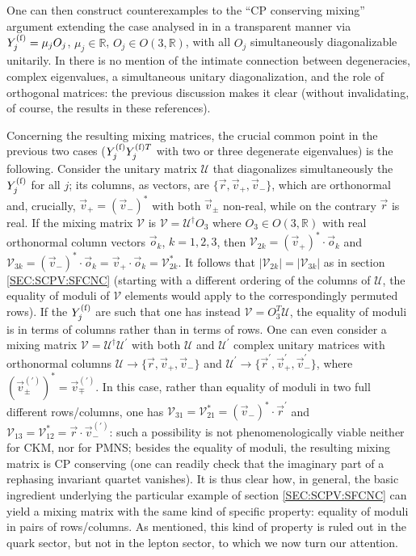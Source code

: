 \documentclass[12pt,a4paper]{article}
\begin{document}
One can then construct counterexamples to the ``CP conserving mixing'' argument extending the case analysed in \cite{Ecker:1987md} in a transparent manner via $Y_{j}^{\rm (f)}=\mu_j O_j$, $\mu_j\in\mathbb{R}$, $O_j\in O(3,\mathbb{R})$, with all $O_j$ simultaneously diagonalizable unitarily. In \cite{Ecker:1987md,Gronau:1987xz} there is no mention of the intimate connection between degeneracies, complex eigenvalues, a simultaneous unitary diagonalization, and the role of orthogonal matrices: the previous discussion makes it clear (without invalidating, of course, the results in these references).

Concerning the resulting mixing matrices, the crucial common point in the previous two cases ($Y_{j}^{\rm (f)}Y_{j}^{{\rm (f)}T}$ with two or three degenerate eigenvalues) is the following. Consider the unitary matrix $\mathcal U$ that diagonalizes simultaneously the $Y_{j}^{\rm (f)}$ for all $j$; its columns, as vectors, are $\{\vec r,\vec v_+,\vec v_-\}$, which are orthonormal and, crucially, $\vec v_+=(\vec v_-)^\ast$ with both $\vec v_\pm$ non-real, while on the contrary $\vec r$ is real. If the mixing matrix $\mathcal V$ is $\mathcal V=\mathcal U^\dagger O_3$ where $O_3\in O(3,\mathbb{R})$ with real orthonormal column vectors $\vec o_k$, $k=1,2,3$, then $\mathcal V_{2k}=(\vec v_+)^\ast\cdot \vec o_k$ and $\mathcal V_{3k}=(\vec v_-)^\ast\cdot \vec o_k=\vec v_+\cdot\vec o_k=\mathcal V_{2k}^\ast$. It follows that $|\mathcal V_{2k}|=|\mathcal V_{3k}|$ as in section \ref{SEC:SCPV:SFCNC} (starting with a different ordering of the columns of $\mathcal U$, the equality of moduli of $\mathcal V$ elements would apply to the correspondingly permuted rows). If the $Y_{j}^{\rm (f)}$ are such that one has instead $\mathcal V=O_3^T\mathcal U$, the equality of moduli is in terms of columns rather than in terms of rows. One can even consider a mixing matrix $\mathcal V=\mathcal U^\dagger \mathcal U^\prime$ with both $\mathcal U$ and $\mathcal U^\prime$ complex unitary matrices with orthonormal columns $\mathcal U\to\{\vec r,\vec v_+,\vec v_-\}$ and $\mathcal U^\prime\to\{\vec r^\prime,\vec v_+^\prime,\vec v_-^\prime\}$, where $(\vec v_{\pm}^{(\prime)})^\ast=\vec v_{\mp}^{(\prime)}$. In this case, rather than equality of moduli in two full different rows/columns, one has $\mathcal V_{31}=\mathcal V_{21}^\ast=(\vec v_-)^\ast\cdot\vec r^\prime$ and $\mathcal V_{13}=\mathcal V_{12}^\ast=\vec r\cdot \vec v_{-}^{(\prime)}$: such a possibility is not phenomenologically viable neither for CKM, nor for PMNS; besides the equality of moduli, the resulting mixing matrix is CP conserving \cite{Gronau:1987xz} (one can readily check that the imaginary part of a rephasing invariant quartet vanishes). It is thus clear how, in general, the basic ingredient underlying the particular example of section \ref{SEC:SCPV:SFCNC} can yield a mixing matrix with the same kind of specific property: equality of moduli in pairs of rows/columns. As mentioned, this kind of property is ruled out in the quark sector, but not in the lepton sector, to which we now turn our attention.
\end{document}
